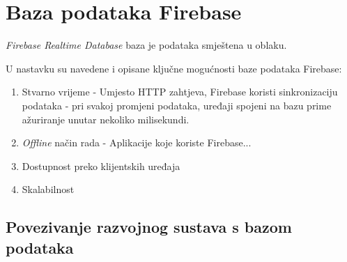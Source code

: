 \chapter{Baza podataka Firebase}

\textit{Firebase Realtime Database} baza je podataka smještena u oblaku.

U nastavku su navedene i opisane ključne mogućnosti baze podataka Firebase:
\begin{enumerate}
	\item Stvarno vrijeme
	- Umjesto HTTP zahtjeva, Firebase koristi sinkronizaciju podataka - pri svakoj promjeni podataka, uređaji spojeni na bazu prime ažuriranje unutar nekoliko milisekundi.
	\item \textit{Offline} način rada
	- Aplikacije koje koriste Firebase...
	\item Dostupnost preko klijentskih uređaja
	\item Skalabilnost
\end{enumerate}

\section{Povezivanje razvojnog sustava s bazom podataka}

\eject